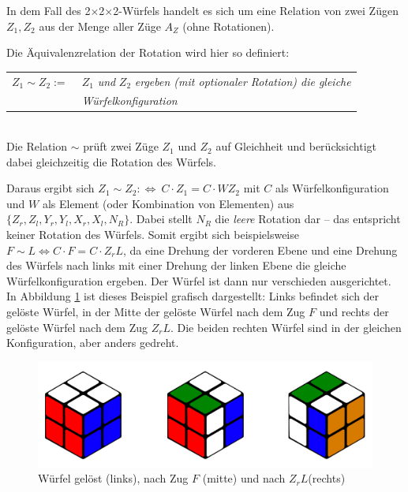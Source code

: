 \documentclass[12pt,a4paper, usenames, dvipsnames]{article}
\theoremstyle{mystyle}
\theoremstyle{definition}
\newcommand{\Ttwo}{2$\times$2$\times$2-}
\begin{document}
In dem Fall des \Ttwo Würfels handelt es sich um eine Relation von zwei Zügen $Z_1, Z_2$ aus der Menge aller Züge $A_Z$ (ohne Rotationen). 

Die Äquivalenzrelation der Rotation wird hier so definiert: 


\begin{tabular}{l l}
$Z_1 \sim Z_2 := \ $  & $Z_1$ \textit{und} $Z_2$ \textit{ergeben (mit optionaler Rotation) die gleiche }\\
\  & \textit{Würfelkonfiguration} \\
\end{tabular} 
\\

Die Relation $\sim$ prüft zwei Züge $Z_1$ und $Z_2$ auf Gleichheit und berücksichtigt dabei gleichzeitig die Rotation des Würfels.

Daraus ergibt sich $Z_1 \sim Z_2 :\Leftrightarrow \ C \cdot Z_1 = C \cdot WZ_2$ mit $C$ als Würfelkonfiguration und $W$ als Element (oder Kombination von Elementen) aus $\{{Z_r}, {Z_l}, {Y_r}, {Y_l}, {X_r}, {X_l}, N_R\}$. Dabei stellt $N_R$ die \textit{leere} Rotation dar -- das entspricht keiner Rotation des Würfels. 
Somit ergibt sich beispielsweise $F \sim L \Leftrightarrow C \cdot F = C \cdot Z_rL$, da eine Drehung der vorderen Ebene und eine Drehung des Würfels nach links mit einer Drehung der linken Ebene die gleiche Würfelkonfiguration ergeben. Der Würfel ist dann nur verschieden ausgerichtet. 
In Abbildung \ref{Abbildung_GelöstnachFnachZL} ist dieses Beispiel grafisch dargestellt: Links befindet sich der gelöste Würfel, in der Mitte der gelöste Würfel nach dem Zug $F$ und rechts der gelöste Würfel nach dem Zug $Z_rL$. Die beiden rechten Würfel sind in der gleichen Konfiguration, aber anders gedreht.
\begin{figure}[h]
\centering
\includegraphics[scale=0.15]{3_wuerfel.png}
\caption[Würfel gelöst, nach Zug $F$ und nach $Z_rL$]{Würfel gelöst (links), nach Zug $F$ (mitte) und nach $Z_rL$(rechts)}
\label{Abbildung_GelöstnachFnachZL}
\end{figure}
\end{document}
